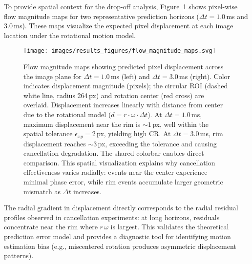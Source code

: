To provide spatial context for the drop-off analysis, Figure~\ref{fig:flow_magnitude} shows pixel-wise flow magnitude maps for two representative prediction horizons ($\Delta t=1.0$\,ms and $3.0$\,ms). These maps visualize the expected pixel displacement at each image location under the rotational motion model.

\begin{figure}[t]
  \centering
  \texttt{[image: images/results\_figures/flow\_magnitude\_maps.svg]}
  \caption{Flow magnitude maps showing predicted pixel displacement across the image plane for $\Delta t=1.0$\,ms (left) and $\Delta t=3.0$\,ms (right). Color indicates displacement magnitude (pixels); the circular ROI (dashed white line, radius 264\,px) and rotation center (red cross) are overlaid. Displacement increases linearly with distance from center due to the rotational model ($d = r \cdot \omega \cdot \Delta t$). At $\Delta t=1.0$\,ms, maximum displacement near the rim is $\sim 1$\,px, well within the spatial tolerance $\epsilon_{xy}=2$\,px, yielding high CR. At $\Delta t=3.0$\,ms, rim displacement reaches $\sim 3$\,px, exceeding the tolerance and causing cancellation degradation. The shared colorbar enables direct comparison. This spatial visualization explains why cancellation effectiveness varies radially: events near the center experience minimal phase error, while rim events accumulate larger geometric mismatch as $\Delta t$ increases.}
  \label{fig:flow_magnitude}
\end{figure}

The radial gradient in displacement directly corresponds to the radial residual profiles observed in cancellation experiments: at long horizons, residuals concentrate near the rim where $r\,\omega$ is largest. This validates the theoretical prediction error model and provides a diagnostic tool for identifying motion estimation bias (e.g., miscentered rotation produces asymmetric displacement patterns).



